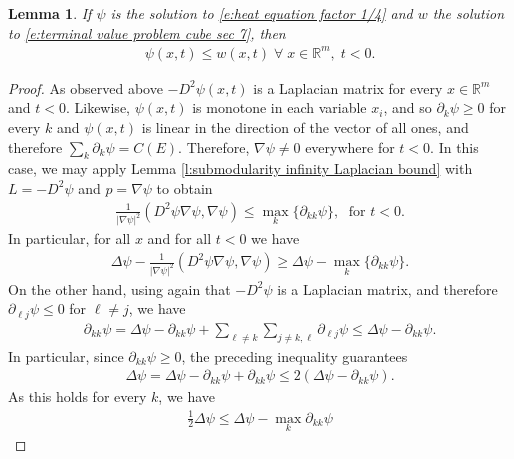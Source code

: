 \documentclass[reqno]{amsart}
\newtheorem{lemma}[theorem]{Lemma}
\numberwithin{equation}{section}
\begin{document}
  
\begin{lemma}\label{l:subsolution via heat equation}
  If $\psi$ is the solution to \eqref{e:heat equation factor 1/4} and $w$ the solution to \eqref{e:terminal value problem cube sec 7}, then
  \begin{align*}
    \psi(x,t) \leq w(x,t) \;\forall\;x\in\mathbb{R}^m,\; t<0.    
  \end{align*}
\end{lemma}

\begin{proof} 

As observed above $-D^2\psi(x,t)$ is a Laplacian matrix for every $x\in\mathbb{R}^m$ and $t<0$. Likewise, $\psi(x,t)$ is monotone in each variable $x_i$, and so $\partial_k \psi \geq 0$ for every $k$ and $\psi(x,t)$ is linear in the direction of the vector of all ones, and therefore  $\sum_k\partial_k \psi = C(E)$. Therefore,  $\nabla \psi \neq 0$ everywhere for $t<0$. In this case, we may apply Lemma \ref{l:submodularity infinity Laplacian bound} with $L= -D^2\psi$ and $p = \nabla \psi$ to obtain
\begin{align*}
  \frac{1}{|\nabla \psi|^2}(D^2\psi \nabla \psi,\nabla \psi) \leq \max_{k} \{ \partial_{kk}\psi \},\;\text{ for } t<0.
\end{align*}
 In particular, for all $x$ and for all $t<0$ we have
\begin{align}
  \Delta \psi - \frac{1}{|\nabla \psi|^2}(D^2\psi \nabla \psi,\nabla \psi) \geq \Delta \psi - \max_k\{ \partial_{kk}\psi\}.    \label{eq:mcf_bound}
\end{align}
On the other hand, using again that $-D^2 \psi$ is a Laplacian matrix, and therefore $\partial_{\ell j}\psi \leq 0$ for $\ell \neq j$, we have  
\begin{align*}
  \partial_{kk}\psi = \Delta \psi -\partial_{kk}\psi + \sum \limits_{\ell \neq k}\sum_{j\neq k,\ell} \partial_{\ell j}\psi \leq \Delta \psi-\partial_{kk}\psi. 
\end{align*}
In particular, since $\partial_{kk} \psi \geq 0$, the preceding inequality guarantees
\begin{align*}
  \Delta  \psi = \Delta \psi-\partial_{kk}\psi + \partial_{kk}\psi \leq 2 (\Delta \psi - \partial_{kk}\psi).    
\end{align*}
As this holds for every $k$, we have
\begin{align}
  \frac{1}{2}\Delta \psi \leq \Delta \psi - \max_k \partial_{kk}\psi  
  \label{eq:trace_bound}
\end{align}

\end{proof}
\end{document}
